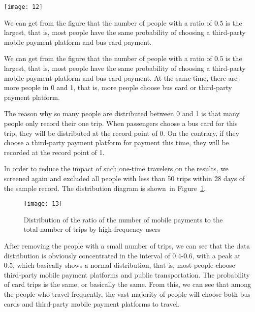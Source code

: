 \documentclass[../mcmpaper]{subfiles}
\begin{document}
\begin{enumerate}[label=\arabic*., format=\bfseries, itemindent=0pt, leftmargin=0pt, topsep=0pt, listparindent=\parindent, itemsep=1pt]
\begin{minipage}{1.0\linewidth}
    \centering
    \texttt{[image: 12]}
    \label{fig:5.8}
\end{minipage}
\par
We can get from the figure that the number of people with a ratio of 0.5 is the largest, that is, most people have the same probability of choosing a third-party mobile payment platform and bus card payment.
\par
We can get from the figure that the number of people with a ratio of 0.5 is the largest, that is, most people have the same probability of choosing a third-party mobile payment platform and bus card payment. At the same time, there are more people in 0 and 1, that is, more people choose bus card or third-party payment platform.
\par
The reason why so many people are distributed between 0 and 1 is that many people only record their one trip. When passengers choose a bus card for this trip, they will be distributed at the record point of 0. On the contrary, if they choose a third-party payment platform for payment this time, they will be recorded at the record point of 1.
\par
In order to reduce the impact of such one-time travelers on the results, we screened again and excluded all people with less than 50 trips within 28 days of the sample record. The distribution diagram is shown~in Figure~\ref{fig:5.9}.
\par
\begin{figure}[tp]
    \centering
    \texttt{[image: 13]}
    \caption{Distribution of the ratio of the number of mobile payments to the total number of trips by high-frequency users}
    \label{fig:5.9}
\end{figure}
After removing the people with a small number of trips, we can see that the data distribution is obviously concentrated in the interval of 0.4-0.6, with a peak at 0.5, which basically shows a normal distribution, that is, most people choose third-party mobile payment platforms and public transportation. The probability of card trips is the same, or basically the same. From this, we can see that among the people who travel frequently, the vast majority of people will choose both bus cards and third-party mobile payment platforms to travel.

\end{enumerate}
\end{document}
